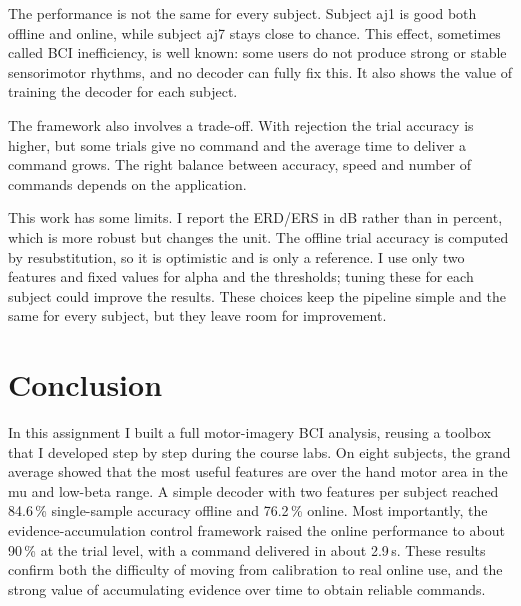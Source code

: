 \documentclass[10pt,twocolumn,a4paper]{article}
\begin{document}
The performance is not the same for every subject. Subject aj1 is good both
offline and online, while subject aj7 stays close to chance. This effect,
sometimes called BCI inefficiency, is well known: some users do not produce
strong or stable sensorimotor rhythms, and no decoder can fully fix this. It also
shows the value of training the decoder for each subject.

The framework also involves a trade-off. With rejection the trial accuracy is
higher, but some trials give no command and the average time to deliver a command
grows. The right balance between accuracy, speed and number of commands depends
on the application.

This work has some limits. I report the ERD/ERS in dB rather than in percent,
which is more robust but changes the unit. The offline trial accuracy is computed
by resubstitution, so it is optimistic and is only a reference. I use only two
features and fixed values for alpha and the thresholds; tuning these for each
subject could improve the results. These choices keep the pipeline simple and the
same for every subject, but they leave room for improvement.

\section{Conclusion}
\label{sec:conclusion}

In this assignment I built a full motor-imagery BCI analysis, reusing a toolbox
that I developed step by step during the course labs. On eight subjects, the
grand average showed that the most useful features are over the hand motor area
in the mu and low-beta range. A simple decoder with two features per subject
reached 84.6\,\% single-sample accuracy offline and 76.2\,\% online. Most
importantly, the evidence-accumulation control framework raised the online
performance to about 90\,\% at the trial level, with a command delivered in about
2.9\,s. These results confirm both the difficulty of moving from calibration to
real online use, and the strong value of accumulating evidence over time to
obtain reliable commands.
\end{document}
